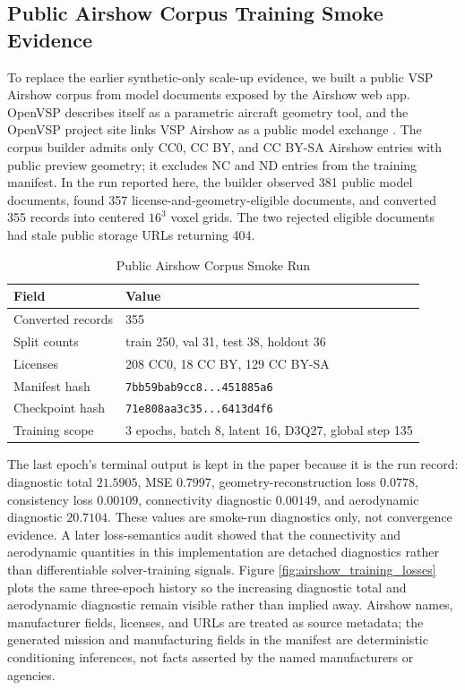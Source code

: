 \subsection{Public Airshow Corpus Training Smoke Evidence}
To replace the earlier synthetic-only scale-up evidence, we built a public VSP Airshow corpus from model documents exposed by the Airshow web app. OpenVSP describes itself as a parametric aircraft geometry tool, and the OpenVSP project site links VSP Airshow as a public model exchange \cite{openvspGithub,openvspLicense,vspAirshow}. The corpus builder admits only CC0, CC BY, and CC BY-SA Airshow entries with public preview geometry; it excludes NC and ND entries from the training manifest. In the run reported here, the builder observed 381 public model documents, found 357 license-and-geometry-eligible documents, and converted 355 records into centered \(16^3\) voxel grids. The two rejected eligible documents had stale public storage URLs returning 404.

\begin{table}[!t]
\centering
\caption{Public Airshow Corpus Smoke Run}
\label{tab:airshow_corpus_smoke}
\footnotesize
\setlength{\tabcolsep}{2pt}
\begin{tabular}{|p{}|p{}|}
\hline
\textbf{Field} & \textbf{Value} \\ \hline
Converted records & 355 \\ \hline
Split counts & train 250, val 31, test 38, holdout 36 \\ \hline
Licenses & 208 CC0, 18 CC BY, 129 CC BY-SA \\ \hline
Manifest hash & \texttt{7bb59bab9cc8...451885a6} \\ \hline
Checkpoint hash & \texttt{71e808aa3c35...6413d4f6} \\ \hline
Training scope & 3 epochs, batch 8, latent 16, D3Q27, global step 135 \\ \hline
\end{tabular}
\end{table}

The last epoch's terminal output is kept in the paper because it is the run record: diagnostic total \(21.5905\), MSE \(0.7997\), geometry-reconstruction loss \(0.0778\), consistency loss \(0.00109\), connectivity diagnostic \(0.00149\), and aerodynamic diagnostic \(20.7104\). These values are smoke-run diagnostics only, not convergence evidence. A later loss-semantics audit showed that the connectivity and aerodynamic quantities in this implementation are detached diagnostics rather than differentiable solver-training signals. Figure \ref{fig:airshow_training_losses} plots the same three-epoch history so the increasing diagnostic total and aerodynamic diagnostic remain visible rather than implied away. Airshow names, manufacturer fields, licenses, and URLs are treated as source metadata; the generated mission and manufacturing fields in the manifest are deterministic conditioning inferences, not facts asserted by the named manufacturers or agencies.

